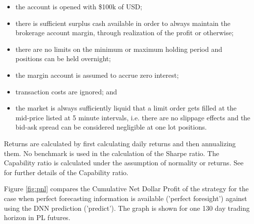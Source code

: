 \documentclass{article}
\begin{document}
\begin{itemize}
\item the account is opened with \$100k of USD;
\item there is sufficient surplus cash available in order to always maintain the brokerage account margin, through realization of the profit or otherwise;
\item there are no limits on the minimum or maximum holding period and positions can be held overnight;
\item the margin account is assumed to accrue zero interest;
\item transaction costs are ignored; and
\item the market is always sufficiently liquid that a limit order gets filled at the mid-price listed at 5 minute intervals, i.e. there are no slippage effects and the bid-ask spread can be considered negligible at one lot positions.
\end{itemize}

Returns are calculated by first calculating daily returns and then annualizing them. No benchmark is used in the calculation of the Sharpe ratio.  The Capability ratio is calculated under the assumption of normality or returns. See \cite{Vliet2014} for further details of the Capability ratio.  

Figure \ref{fig:pnl} compares the Cumulative Net Dollar Profit of the strategy for the case when perfect forecasting information is available ('perfect foresight') against using the DNN prediction ('predict').  The graph is shown for one 130 day trading horizon in PL futures. 

\end{document}
